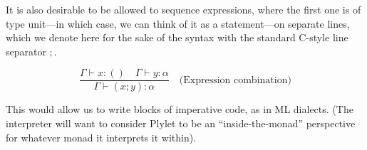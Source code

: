 \documentclass{article}
\begin{document}
It is also desirable to be allowed to sequence expressions, where the first one
is of type unit---in which case, we can think of it as a statement---on separate
lines, which we denote here for the sake of the syntax with the standard C-style
line separator $;$.

\[ \frac{\Gamma\vdash x\mathbin{:}()\quad\Gamma\vdash y\mathbin{:}\alpha}{\Gamma\vdash (x\mathbin{;}y)\mathbin{:}\alpha}\quad\text{(Expression combination)} \]

This would allow us to write blocks of imperative code, as in ML dialects. (The
interpreter will want to consider Plylet to be an ``inside-the-monad''
perspective for whatever monad it interprets it within).
\end{document}

